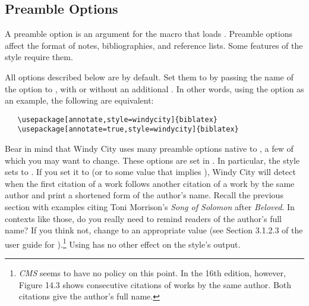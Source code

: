 \documentclass[11pt,letterpaper,oneside]{article}
\begin{document}
\subsection{Preamble Options}
\label{preops}

A preamble option is an argument for the  macro that
loads \biblatex. Preamble options affect the format of notes,
bibliographies, and reference lists. Some features of the style
require them.

All options described below are  by default. Set them to
 by passing the name of the option to \biblatex, with or
without an additional . In other words, using the option
 as an example, the following are equivalent:

\begin{verbatim}
   \usepackage[annotate,style=windycity]{biblatex}
   \usepackage[annotate=true,style=windycity]{biblatex}
\end{verbatim}

Bear in mind that Windy City uses many preamble options native to
\biblatex, a few of which you may want to change. These options are
set in . In particular, the style sets
 to . If you set it to  (or to
some value that implies ), Windy City will detect when the
first citation of a work follows another citation of a work by the
same author and print a shortened form of the author's name. Recall
the previous section with examples citing Toni Morrison's \textit{Song
of Solomon} after \textit{Beloved}. In contexts like those, do you
really need to remind readers of the author's full name? If you think
not, change  to an appropriate value (see Section
3.1.2.3 of the user guide for \biblatex).\footnote{\textit{CMS} seems
to have no policy on this point. In the 16th edition, however, Figure
14.3 shows consecutive citations of works by the same author. Both
citations give the author's full name.} Using  has no
other effect on the style's output.
\end{document}
